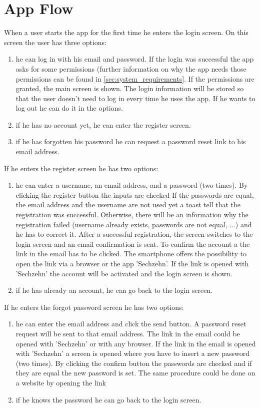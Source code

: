 \documentclass[11pt, accentcolor=tud1c]{tudreport}
\begin{document}
\section{App Flow}
When a user starts the app for the first time he enters the login screen. On this screen the user has three options:
\begin{enumerate}
\item he can log in with his email and password. If the login was successful the app asks for some permissions (further information on why the app needs those permissions can be found in \ref{sec:system_requirements}.
If the permissions are granted, the main screen is shown. The login information will be stored so that the user doesn't need to log in every time he uses the app. If he wants to log out he can do it in the options.
\item if he has no account yet, he can enter the register screen.
\item if he has forgotten his password he can request a password reset link to his email address.
\end{enumerate}
If he enters the register screen he has two options:   
\begin{enumerate}
\item he can enter a username, an email address, and a password (two times). By clicking the register button the inputs are checked If the passwords are equal, the email address and the username are not used yet a toast tell that the registration was successful. Otherwise, there will be an information why the registration failed (username already exists, passwords are not equal, ...) and he has to correct it. After a successful registration, the screen switches to the login screen and an email confirmation is sent. To confirm the account a the link in the email has to be clicked. The smartphone offers the possibility to open the link via a browser or the app 'Sechzehn'. If the link is opened with 'Sechzehn' the account will be activated and the login screen is shown.  
\item if he has already an account, he can go back to the login screen.
\end{enumerate}
If he enters the forgot password screen he has two options:
\begin{enumerate}
\item he can enter the email address and click the send button. A password reset request will be sent to that email address. The link in the email could be opened with 'Sechzehn' or with any browser. If the link in the email is opened with 'Sechzehn' a screen is opened where you have to insert a new password (two times). By clicking the confirm button the passwords are checked and if they are equal the new password is set. The same procedure could be done on a website by opening the link 
\item if he knows the password he can go back to the login screen.
\end{enumerate}
\end{document}
